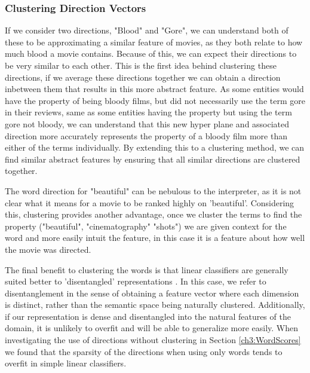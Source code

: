 \subsubsection{Clustering Direction Vectors}

If we consider two directions, "Blood" and "Gore", we can understand both of these to be approximating a similar feature of movies, as they both relate to how much blood a movie contains. Because of this, we can expect their directions to be very similar to each other. This is the first idea behind clustering these directions, if we average these directions together we can obtain a direction inbetween them that results in this more abstract feature. As some entities would have the property of being bloody films, but did not necessarily use the term gore in their reviews, same as some entities having the property but using the term gore not bloody, we can understand that this new hyper plane and associated direction more accurately represents the property of a bloody film more than either of the terms individually. By extending this to a clustering method, we can find similar abstract features by ensuring that all similar directions are clustered together. %

The word direction for "beautiful" can be nebulous to the interpreter, as it is not clear what it means for a movie to be ranked highly on 'beautiful'. Considering this, clustering provides another advantage, once we cluster the terms to find the property ("beautiful", "cinematography" "shots") we are given context for the word and more easily intuit the feature, in this case it is a feature about how well the movie was directed. 

The final benefit to clustering the words is that linear classifiers are generally suited better to 'disentangled' representations \cite{Bengio2012}. In this case, we refer to disentanglement in the sense of obtaining a feature vector where each dimension is distinct, rather than the semantic space being naturally clustered. Additionally, if our representation is dense and disentangled into the natural features of the domain, it is unlikely to overfit and will be able to generalize more easily. When investigating the use of directions without clustering in Section \ref{ch3:WordScores} we found that the sparsity of the directions when using only words tends to overfit in simple linear classifiers.

